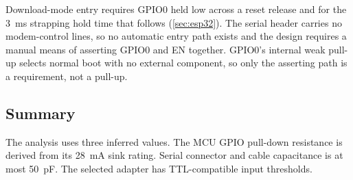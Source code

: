 Download-mode entry requires GPIO0 held low across a reset release and for the
\SI{3}{\milli\second} strapping hold time that follows
(\cref{sec:esp32}). The serial header carries no modem-control lines, so no
automatic entry path exists and the design requires a manual means of
asserting GPIO0 and EN together. GPIO0's internal weak pull-up selects normal
boot with no external component, so only the asserting path is a requirement,
not a pull-up.

\subsection{Summary}\label{sec:esp32-summary}

The analysis uses three inferred values. The MCU GPIO pull-down resistance is
derived from its \SI{28}{\milli\ampere} sink rating. Serial connector and cable
capacitance is at most \SI{50}{\pico\farad}. The selected adapter has
TTL-compatible input thresholds.

